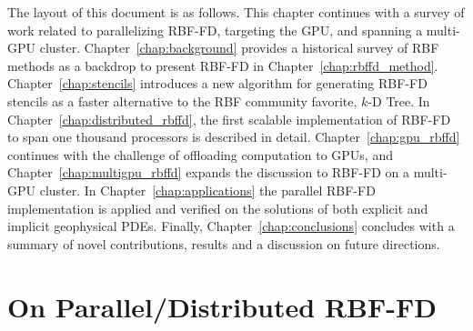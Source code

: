 \documentclass[11pt]{report}
\begin{document}
%
%
%
%



The layout of this document is as follows. This chapter continues with a survey of work related to parallelizing RBF-FD, targeting the GPU, and spanning a multi-GPU cluster. Chapter~\ref{chap:background} provides a historical survey of RBF methods as a backdrop to present RBF-FD in Chapter~\ref{chap:rbffd_method}. Chapter~\ref{chap:stencils} introduces a new algorithm for generating RBF-FD stencils as a faster alternative to the RBF community favorite, $k$-D Tree. In Chapter~\ref{chap:distributed_rbffd}, the first scalable implementation of RBF-FD to span one thousand processors is described in detail. Chapter~\ref{chap:gpu_rbffd} continues with the challenge of offloading computation to GPUs, and Chapter~\ref{chap:multigpu_rbffd} expands the discussion to RBF-FD on a multi-GPU cluster. In Chapter~\ref{chap:applications} the parallel RBF-FD implementation is applied and verified on the solutions of both explicit and implicit geophysical PDEs. Finally, Chapter~\ref{chap:conclusions} concludes with a summary of novel contributions, results and a discussion on future directions.

\section{On Parallel/Distributed RBF-FD} 
\end{document}
